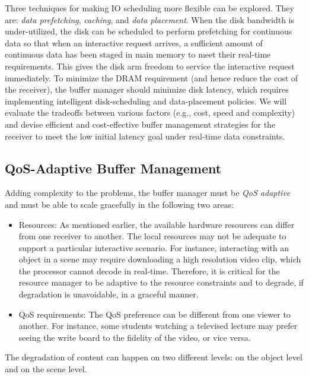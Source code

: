 Three techniques for making IO scheduling more flexible can
be explored. They are: {\em data
prefetching}, {\em caching}, and {\em data placement}.
When the disk bandwidth is under-utilized, the disk
can be scheduled to perform prefetching
for continuous data so that when
an interactive request arrives, a sufficient amount of
continuous data has
been staged in main memory to meet their real-time
requirements. This gives the disk arm
freedom to service the interactive request immediately.
To minimize the DRAM requirement (and hence reduce the
cost of the receiver), the buffer manager
should minimize disk latency, which requires implementing
intelligent disk-scheduling and data-placement policies.
We will evaluate the tradeoffs between
various factors (e.g., cost, speed and complexity) and devise
efficient and cost-effective buffer management strategies
for the receiver to meet the low initial latency goal 
under real-time data constraints.
                              
\subsection{QoS-Adaptive Buffer Management}

Adding complexity to the problems, the buffer manager must be
{\em QoS adaptive} and must be able to scale gracefully in the following
two areas:
\begin{itemize}
\item Resources:
As mentioned earlier, the
available hardware resources can differ from one receiver
to another. The local resources may not be adequate
to support a particular interactive scenario.
For instance, interacting with an object in a scene 
may require downloading a high
resolution video clip, which the processor cannot decode
in real-time.  Therefore, it is critical for the resource 
manager to be adaptive to
the resource constraints and to degrade, if degradation is
unavoidable, in a graceful manner.  
\item QoS requirements:
The QoS preference can be different from one viewer to another.
For instance, some students watching a televised lecture 
may prefer seeing the write board
to the fidelity of the video, or vice versa.
\end{itemize}

The degradation of content can happen on two different
levels: on the object level and on the scene level.
                                                 
